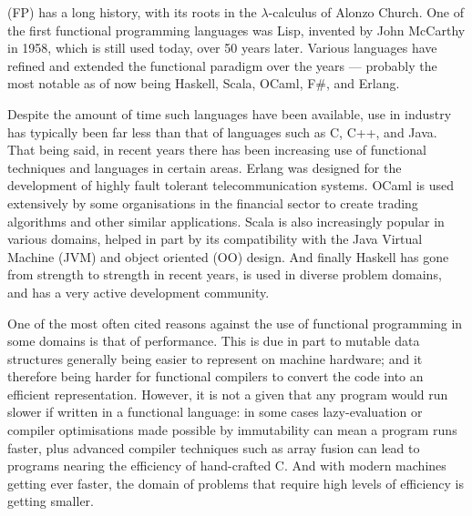  (FP) has a long history, with its roots in the $\lambda$-calculus of Alonzo Church. One of the first functional programming languages was Lisp, invented by John McCarthy in 1958, which is still used today, over 50 years later. Various languages have refined and extended the functional paradigm over the years --- probably the most notable as of now being Haskell, Scala, OCaml, F\#, and Erlang.

Despite the amount of time such languages have been available, use in industry has typically been far less than that of languages such as C, C++, and Java. That being said, in recent years there has been increasing use of functional techniques and languages in certain areas. Erlang was designed for the development of highly fault tolerant telecommunication systems.\cite[-1em]{armstrong2007history} OCaml is used extensively by some organisations in the financial sector to create trading algorithms and other similar applications. Scala is also increasingly popular in various domains, helped in part by its compatibility with the Java Virtual Machine (JVM) and object oriented (OO) design. And finally Haskell has gone from strength to strength in recent years, is used in diverse problem domains, and has a very active development community.

One of the most often cited reasons against the use of functional programming in some domains is that of performance. This is due in part to mutable data structures generally being easier to represent on machine hardware; and it therefore being harder for functional compilers to convert the code into an efficient representation. However, it is not a given that any program would run slower if written in a functional language: in some cases lazy-evaluation or compiler optimisations made possible by immutability can mean a program runs faster, plus advanced compiler techniques such as array fusion can lead to programs nearing the efficiency of hand-crafted C. And with modern machines getting ever faster, the domain of problems that require high levels of efficiency is getting smaller.

